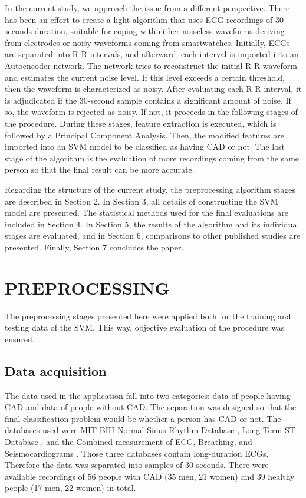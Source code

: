 In the current study, we approach the issue from a different perspective. There has been an effort to create a light algorithm that uses ECG recordings of 30 seconds duration, suitable for coping with either noiseless waveforms deriving from electrodes or noisy waveforms coming from smartwatches. Initially, ECGs are separated into R-R intervals, and afterward, each interval is imported into an Autoencoder network. The network tries to reconstruct the initial R-R waveform and estimates the current noise level. If this level exceeds a certain threshold, then the waveform is characterized as noisy. After evaluating each R-R interval, it is adjudicated if the 30-second sample contains a significant amount of noise. If so, the waveform is rejected as noisy. If not, it proceeds in the following stages of the procedure.
During these stages, feature extraction is executed, which is followed by a Principal Component Analysis. Then, the modified features are imported into an SVM model to be classified as having CAD or not. The last stage of the algorithm is the evaluation of more recordings coming from the same person so that the final result can be more accurate.

Regarding the structure of the current study, the preprocessing algorithm stages are described in Section 2. In Section 3, all details of constructing the SVM model are presented. The statistical methods used for the final evaluations are included in Section 4. In Section 5, the results of the algorithm and its individual stages are evaluated, and in Section 6, comparisons to other published studies are presented. Finally, Section 7 concludes the paper.


\section{PREPROCESSING}
\label{sec:preprocessing}

The preprocessing stages presented here were applied both for the training and testing data of the SVM. This way, objective evaluation of the procedure was ensured.

\subsection{Data acquisition}
\label{ssec:data_acquisition}

The data used in the application fall into two categories: data of people having CAD and data of people without CAD. The separation was designed so that the final classification problem would be whether a person has CAD or not. The databases used were MIT-BIH Normal Sinus Rhythm Database \cite{MIT-BIH-Normal_sinus}, Long Term ST Database \cite{Long_Term_ST}, and the Combined measurement of ECG, Breathing, and Seismocardiograms \cite{combined_ecg_database}. Those three databases contain long-duration ECGs. Therefore the data was separated into samples of 30 seconds. There were available recordings of 56 people with CAD (35 men, 21 women) and 39 healthy people (17 men, 22 women) in total. 

